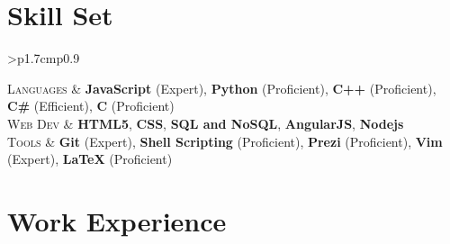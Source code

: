 \documentclass[a4paper,10pt]{article} %
\newcommand{\itemlist}[1]{
    \begin{tabular}{>{\raggedleft}p{1.7cm}p{0.9\linewidth}}
        #1
    \end{tabular}
}
\begin{document}
\section{Skill Set}

\itemlist {
    \textsc{Languages} %
            & \textbf{JavaScript} (Expert), \textbf{Python} (Proficient), \textbf{C++} (Proficient), \textbf{C\#} (Efficient),
              \textbf{C} (Proficient)\\
    \textsc{Web Dev} %
            & \textbf{HTML5}, \textbf{CSS}, \textbf{SQL and NoSQL}, \textbf{AngularJS}, \textbf{Nodejs}\\
    \textsc{Tools} %
            & \textbf{Git} (Expert), \textbf{Shell Scripting} (Proficient), \textbf{Prezi} (Proficient), \textbf{Vim} (Expert), \textbf{LaTeX}
              (Proficient)\\
}


\section{Work Experience}
\end{document}
